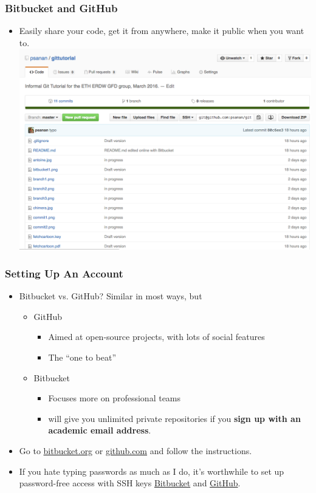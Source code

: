 \documentclass{beamer}
\begin{document}
\begin{frame}[fragile]
\frametitle{Bitbucket and GitHub}
\begin{itemize}
\item Easily share your code, get it from anywhere, make it public when you want to. \\
\includegraphics[scale=0.3]{github1}
\end{itemize}
\end{frame}

\begin{frame}[fragile]
\frametitle{Setting Up An Account}
\begin{itemize}
\item Bitbucket vs. GitHub? Similar in most ways, but
\begin{itemize}
\item
GitHub
\begin{itemize}
\item Aimed at open-source projects, with lots of social features
\item The ``one to beat''
\end{itemize}
\item Bitbucket 
\begin{itemize}
\item Focuses more on professional teams
\item will give you unlimited private repositories if you \textbf{sign up with an academic email address}. 
\end{itemize}
\end{itemize}
\item Go to \href{https://bitbucket.org}{bitbucket.org} or \href{https://github.com}{github.com} and follow the instructions.
\item If you hate typing passwords as much as I do, it's worthwhile to set up password-free access with SSH keys
\href{https://confluence.atlassian.com/bitbucket/set-up-ssh-for-git-728138079.html}{Bitbucket} and
\href{https://help.github.com/articles/adding-a-new-ssh-key-to-your-github-account/}{GitHub}.
\end{itemize}
\end{frame}
\end{document}
